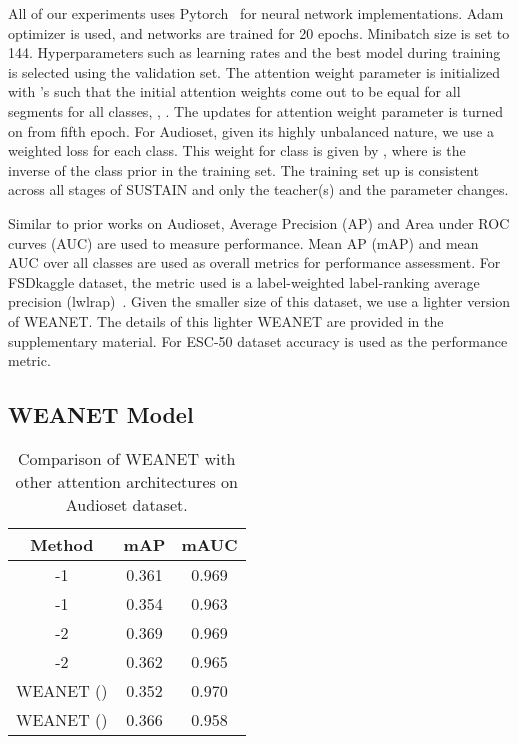 \documentclass{article}
\begin{document}
 \label{sec:exp-setup}
All of our experiments uses Pytorch~\cite{paszke2017automatic} for neural network implementations. Adam optimizer is used, and networks are trained for 20 epochs. Minibatch size is set to 144. Hyperparameters such as learning rates and the best model during training is selected using the validation set. The attention weight parameter  is initialized with 's such that the initial attention weights come out to be equal for all segments for all classes, , . The updates for attention weight parameter is turned on from fifth epoch. For Audioset, given its highly unbalanced nature, we use a weighted loss for each class. 
This weight for class  is given by , 
where  is the inverse of the class prior in the training set. The training set up is consistent across all stages of SUSTAIN and only the teacher(s) and the parameter  changes. 

Similar to prior works on Audioset, Average Precision (AP) and Area under ROC curves (AUC) are used to measure performance. 
Mean AP (mAP) and mean AUC over all classes are used as overall metrics for performance assessment. For FSDkaggle dataset, the metric used is a label-weighted label-ranking average precision (lwlrap)~\cite{fonseca2019audio}. 
Given the smaller size of this dataset, we use a lighter version of WEANET. 
The details of this lighter WEANET are provided in the supplementary material. For ESC-50 dataset accuracy is used as the performance metric. 


\subsection{WEANET Model} \label{sec:weanet-eval}

\begin{table}[t!]
  \centering
\begin{tabular}{c|c|c}
    \toprule
	Method & mAP & mAUC \\ \midrule
    \cite{kong2019weakly}-1 & 0.361 & 0.969 \\
	\cite{wang2019comparison}-1  & 0.354 & 0.963 \\ 
	\midrule
	\cite{kong2019weakly}-2   & 0.369 &  0.969 \\
	\cite{wang2019comparison}-2 & 0.362  & 0.965 \\
	\midrule
	WEANET () & 0.352 & 0.970 \\
	WEANET ()  & 0.366  & 0.958 \\
	\bottomrule
    \end{tabular}\caption{Comparison of WEANET with other attention architectures on Audioset dataset.}
  \label{tab:weanet}\end{table}
\end{document}
